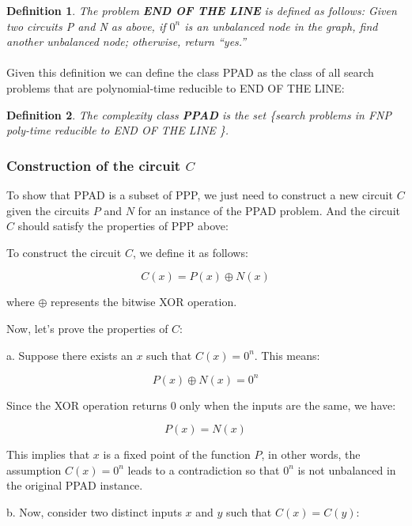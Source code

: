 \documentclass{article}
\newtheorem{definition}{Definition}
\begin{document}
\begin{definition}
    The problem \textit{\textbf{END OF THE LINE}} is defined as follows: 
Given two circuits P and N as above, if $0^n$ is an unbalanced node in the graph, find another unbalanced node; otherwise, return “yes.”
\end{definition}

\paragraph{}
Given this definition we can define the class PPAD as the class of all search problems that are polynomial-time reducible to END OF THE LINE:

\begin{definition}
    The complexity class \textit{\textbf{PPAD}} is the set 
\{search problems in FNP poly-time reducible to END OF THE LINE 
 \}.
\end{definition}


\subsubsection{Construction of the circuit \(C\)}

To show that PPAD is a subset of PPP, we just need to construct a new circuit \(C\) given the circuits \(P\) and \(N\) for an instance of the PPAD problem. And the circuit \(C\) should satisfy the properties of PPP above:

To construct the circuit \(C\), we define it as follows:

\[
C(x) = P(x) \oplus N(x)
\]

where \(\oplus\) represents the bitwise XOR operation.

Now, let's prove the properties of \(C\):

a. Suppose there exists an \(x\) such that \(C(x) = 0^n\). This means:

\[
P(x) \oplus N(x) = 0^n
\]

Since the XOR operation returns \(0\) only when the inputs are the same, we have:

\[
P(x) = N(x)
\]

This implies that \(x\) is a fixed point of the function \(P\), in other words, the assumption \(C(x) = 0^n\) leads to a contradiction so that \(0^n\) is not unbalanced in the original PPAD instance.

b. Now, consider two distinct inputs \(x\) and \(y\) such that \(C(x) = C(y)\):
\end{document}
